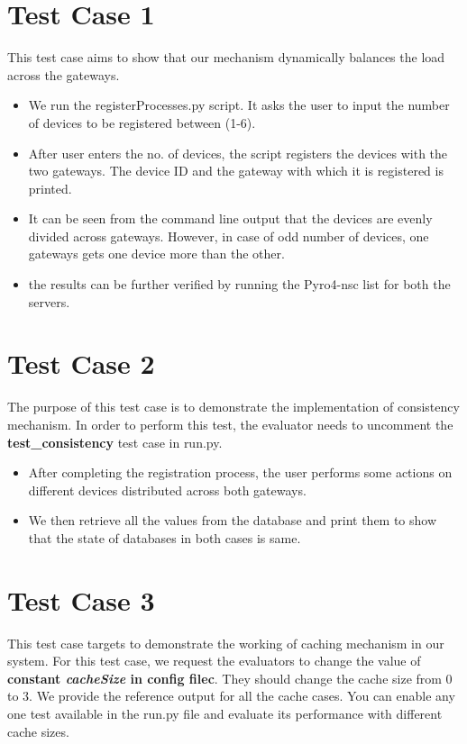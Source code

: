 \documentclass[12pt]{article}
\begin{document}
\section{Test Case 1}
This test case aims to show that our mechanism dynamically balances the 
load across the gateways. 

\begin{itemize}
	\item We run the registerProcesses.py script. It asks the user to input the 
	number of devices to be registered between (1-6). 
	\item After user enters the no. of devices, the script registers the devices 
	with the two gateways. The device ID and the gateway with which it is 
	registered is printed. 
	\item It can be seen from the command line output that the devices are 
	evenly divided across gateways. However, in case of odd number of devices, 
	one gateways gets one device more than the other. 
	\item the results can be further verified by running the Pyro4-nsc list for 
	both the servers. 
\end{itemize}


\section{Test Case 2}

The purpose of this test case is to demonstrate the implementation 
of consistency mechanism. In order to perform this test, the evaluator 
needs to uncomment the 
\textbf{test\_consistency} test case in run.py.

\begin{itemize}
	\item After completing the registration process, the user performs some 
	actions on different devices distributed across both gateways. 
	\item We then retrieve all the values from the database and print them  to show that 
	the state of databases in both cases is same. 
\end{itemize}


\section{Test Case 3}

This test case targets to demonstrate the working of caching mechanism in 
our system. For this test case, we request the evaluators to change the 
value of \textbf{constant \textit{cacheSize} in config filec}. They should change the cache 
size from 0 to 3. We provide the reference output for all the cache cases. 
You can enable any one test available in the run.py file and evaluate its 
performance with different cache sizes. 
\end{document}
